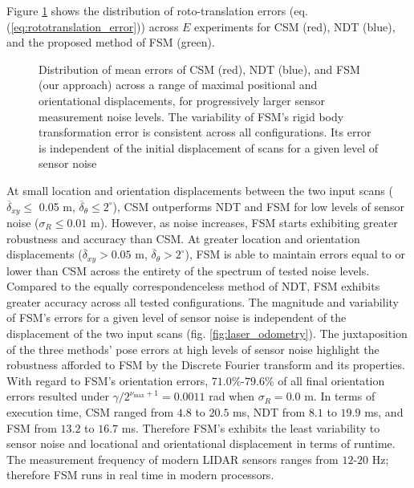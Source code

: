 Figure \ref{fig:errors_sm} shows the distribution of roto-translation errors
(eq. (\ref{eq:rototranslation_error})) across $E$ experiments for CSM (red),
NDT (blue), and the proposed method of FSM (green).

\begin{figure}[]\centering
  \vspace{-1.5cm}
  
  \vspace{-1.5cm}
  \caption{\small Distribution of mean errors of CSM (red), NDT (blue), and
           FSM (our approach) across a range of maximal positional and
           orientational displacements, for progressively larger sensor
           measurement noise levels. The variability of FSM's rigid body
           transformation error is consistent across all configurations. Its
           error is independent of the initial displacement of scans for a
           given level of sensor noise}
  \label{fig:errors_sm}
\end{figure}

At small location and orientation displacements between the two input scans
($\overline{\delta}_{xy} \leq $ 0.05 m,
$\overline{\delta}_\theta \leq 2^\circ$), CSM outperforms NDT and FSM for low
levels of sensor noise ($\sigma_R \leq 0.01$ m). However, as noise increases,
FSM starts exhibiting greater robustness and accuracy than CSM. At greater
location and orientation displacements
($\overline{\delta}_{xy} > 0.05$ m, $\overline{\delta}_\theta > 2^\circ$), FSM
is able to maintain errors equal to or lower than CSM across the entirety of
the spectrum of tested noise levels. Compared to the equally
correspondenceless method of NDT, FSM exhibits greater accuracy across all
tested configurations. The magnitude and variability of FSM's errors for a
given level of sensor noise is independent of the displacement of the two input
scans (fig. \ref{fig:laser_odometry}). The juxtaposition of the three methods'
pose errors at high levels of sensor noise highlight the robustness afforded to
FSM by the Discrete Fourier transform and its properties. With regard to FSM's
orientation errors, $71.0\%$-$79.6\%$ of all final orientation errors resulted
under $\gamma / 2^{\nu_{\max}+1} = 0.0011$ rad when $\sigma_R = 0.0$ m. In terms
of execution time, CSM ranged from $4.8$ to $20.5$ ms, NDT from $8.1$ to $19.9$
ms, and FSM from $13.2$ to $16.7$ ms. Therefore FSM's exhibits the least
variability to sensor noise and locational and orientational displacement in
terms of runtime.  The measurement frequency of modern LIDAR sensors ranges
from $12$-$20$ Hz; therefore FSM runs in real time in modern processors.
